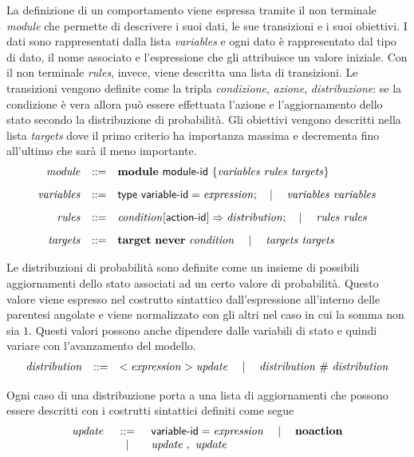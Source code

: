 La definizione di un comportamento viene espressa tramite il non terminale \emph{module} che permette di descrivere i suoi dati, le sue transizioni e i suoi obiettivi. I dati sono rappresentati dalla lista \emph{variables} e ogni dato è rappresentato dal tipo di dato, il nome associato e l'espressione che gli attribuisce un valore iniziale. Con il non terminale \emph{rules}, invece, viene descritta una lista di transizioni. Le transizioni vengono definite come la tripla \emph{condizione}, \emph{azione}, \emph{distribuzione}: se la condizione è vera allora può essere effettuata l'azione e l'aggiornamento dello stato secondo la distribuzione di probabilità. Gli obiettivi vengono descritti nella lista \emph{targets} dove il primo criterio ha importanza massima e decrementa fino all'ultimo che sarà il meno importante.
$$
\begin{array}{rcl}
	\mathit{module} &::=& \mathbf{module} \mbox{ } {\sf module}\textrm{-}{\sf id} \mbox{ } \{ \mathit{variables} \mbox{ } \mathit{rules} \mbox{ } \mathit{targets} \}
		\\[.3cm]
	\mathit{variables} &::=& {\sf type} \mbox{ } {\sf variable}\textrm{-}{\sf id} = \mathit{expression}; \quad\mid\quad \mathit{variables} \mbox{ } \mathit{variables}
		\\[.3cm]
	\mathit{rules} &::=& \mathit{condition} [ {\sf action}\textrm{-}{\sf id}] \Rightarrow \mathit{distribution}; \quad\mid\quad \mathit{rules} \mbox{ } \mathit{rules}
		\\[.3cm]
	\mathit{targets} &::=& \mathbf{target} \mbox{ } \mathbf{never} \mbox{ } \mathit{condition} \quad\mid\quad \mathit{targets} \mbox{ } \mathit{targets} \\
\end{array}
$$

Le distribuzioni di probabilità sono definite come un insieme di possibili aggiornamenti dello stato associati ad un certo valore di probabilità. Questo valore viene espresso nel costrutto sintattico dall'espressione all'interno delle parentesi angolate e viene normalizzato con gli altri nel caso in cui la somma non sia $1$. Questi valori possono anche dipendere dalle variabili di stato e quindi variare con l'avanzamento del modello.
$$
\begin{array}{rcl}
	\mathit{distribution} &::=& <\mathit{expression}> \mathit{update} \quad\mid\quad \mathit{distribution} \mbox{ } \# \mbox{ } \mathit{distribution} \\
\end{array}
$$

Ogni caso di una distribuzione porta a una lista di aggiornamenti che possono essere descritti con i costrutti sintattici definiti come segue
$$
\begin{array}{rcl}
	\mathit{update} &::=& {\sf variable}\textrm{-}{\sf id} = \mathit{expression} \quad\mid\quad \mathbf{noaction} \\
		& \quad\mid\quad & \mathit{update} \mbox{ } , \mbox{ } \mathit{update} \\
\end{array}
$$

